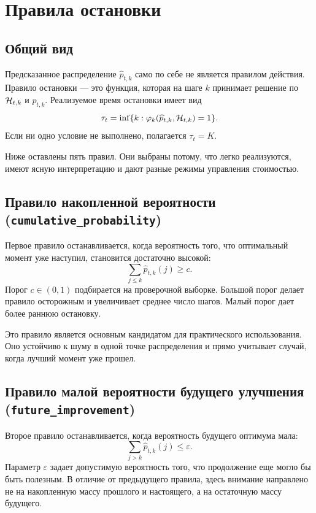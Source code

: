 \section{Правила остановки}

\subsection{Общий вид}

Предсказанное распределение \(\widehat p_{t,k}\) само по себе не является правилом действия.
Правило остановки --- это функция, которая на шаге \(k\) принимает решение по \(\mathcal{H}_{t,k}\) и
\(\widehat p_{t,k}\). Реализуемое время остановки имеет вид
\begin{equation}
  \tau_t=\inf\{k:\varphi_k(\widehat p_{t,k},\mathcal{H}_{t,k})=1\}.
  \label{eq:real_stopping_rule}
\end{equation}
Если ни одно условие не выполнено, полагается \(\tau_t=K\).

Ниже оставлены пять правил. Они выбраны потому, что легко реализуются, имеют ясную интерпретацию и
дают разные режимы управления стоимостью.

\subsection{Правило накопленной вероятности (\texttt{cumulative\_probability})}

Первое правило останавливается, когда вероятность того, что оптимальный момент уже наступил,
становится достаточно высокой:
\begin{equation}
  \sum_{j\le k}\widehat p_{t,k}(j)\ge c.
  \label{eq:rule_cdf}
\end{equation}
Порог \(c\in(0,1)\) подбирается на проверочной выборке. Большой порог делает правило осторожным и
увеличивает среднее число шагов. Малый порог дает более раннюю остановку.

Это правило является основным кандидатом для практического использования. Оно устойчиво к шуму в
одной точке распределения и прямо учитывает случай, когда лучший момент уже прошел.

\subsection{Правило малой вероятности будущего улучшения (\texttt{future\_improvement})}

Второе правило останавливается, когда вероятность будущего оптимума мала:
\begin{equation}
  \sum_{j>k}\widehat p_{t,k}(j)\le \varepsilon.
  \label{eq:rule_future}
\end{equation}
Параметр \(\varepsilon\) задает допустимую вероятность того, что продолжение еще могло бы быть
полезным. В отличие от предыдущего правила, здесь внимание направлено не на накопленную массу
прошлого и настоящего, а на остаточную массу будущего.

